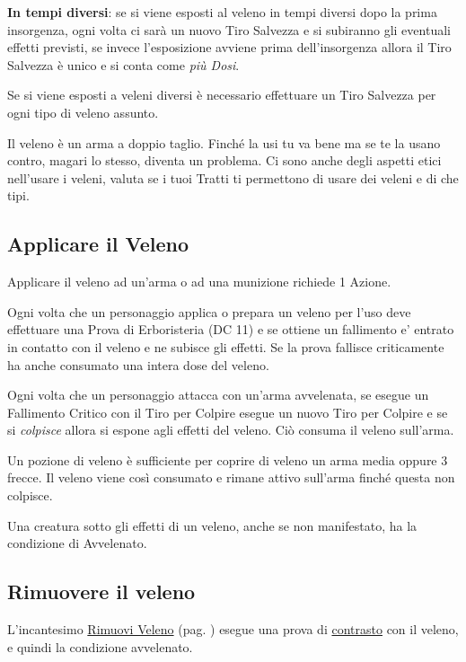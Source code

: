 \begin{multicols}{2}
\textbf{In tempi diversi}: se si viene esposti al veleno in tempi diversi dopo la prima insorgenza, ogni volta ci sarà un nuovo Tiro Salvezza e si subiranno gli eventuali effetti previsti, se invece l'esposizione avviene prima dell'insorgenza allora il Tiro Salvezza è unico e si conta come \emph{più Dosi}.

Se si viene esposti a veleni diversi è necessario effettuare un Tiro Salvezza per ogni tipo di veleno assunto.

\begin{giocatore}[Veleno ?]
{Il veleno è un arma a doppio taglio. Finché la usi tu va bene ma se te la usano contro, magari lo stesso, diventa un problema. Ci sono anche degli aspetti etici nell'usare i veleni, valuta se i tuoi Tratti ti permettono di usare dei veleni e di che tipi.}\end{giocatore}

\subsection{Applicare il Veleno}\label{applicareveleno}

Applicare il veleno ad un'arma o ad una munizione richiede 1 Azione.

Ogni volta che un personaggio applica o prepara un veleno per l'uso deve effettuare una Prova di Erboristeria (DC 11) e se ottiene un fallimento e' entrato in contatto con il veleno e ne subisce gli effetti. Se la prova fallisce criticamente ha anche consumato una intera dose del veleno.

Ogni volta che un personaggio attacca con un'arma avvelenata, se esegue un Fallimento Critico con il Tiro per Colpire esegue un nuovo Tiro per Colpire e se si \emph{colpisce} allora si espone agli effetti del veleno. Ciò consuma il veleno sull'arma.

Un pozione di veleno è sufficiente per coprire di veleno un arma media oppure 3 frecce. Il veleno viene così consumato e rimane attivo sull'arma finché questa non colpisce.

Una creatura sotto gli effetti di un veleno, anche se non manifestato, ha la condizione di Avvelenato.

\subsection{Rimuovere il veleno}

L'incantesimo \hyperlink{incrimuoviveleno}{Rimuovi Veleno} (pag. \pageref{incrimuoviveleno}) esegue una prova di \hyperlink{contrastareincantesimi}{contrasto} con il veleno, e quindi la condizione avvelenato.


\end{multicols}
